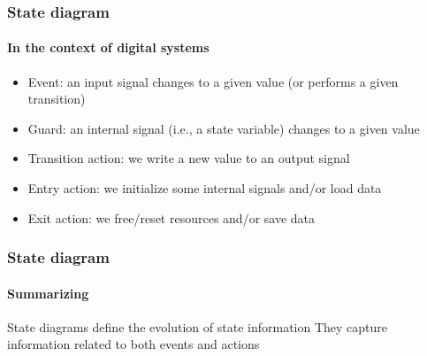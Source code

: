 \begin{frame}
\frametitle{State diagram}
\framesubtitle{In the context of digital systems}

\begin{itemize}
\item Event: an input signal changes to a given value (or performs a given transition)
\item Guard: an internal signal (i.e., a state variable) changes to a given value
\item Transition action: we write a new value to an output signal
\item Entry action: we initialize some internal signals and/or load data
\item Exit action: we free/reset resources and/or save data
\end{itemize}
\end{frame}

\begin{frame}
\frametitle{State diagram}
\framesubtitle{Summarizing}

\begin{block}{State diagrams define the evolution of state information}
They capture information related to both events and actions
\end{block}
\end{frame}